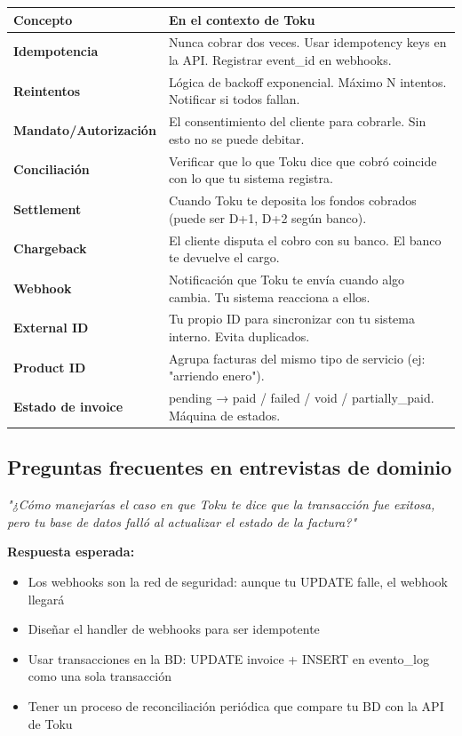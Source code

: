 \documentclass[11pt,a4paper]{article}
\begin{document}
\begin{center}
\begin{tabular}{p{3.5cm}p{10.5cm}}
\toprule
\textbf{Concepto} & \textbf{En el contexto de Toku} \\
\midrule
\textbf{Idempotencia} & Nunca cobrar dos veces. Usar idempotency keys en la API. Registrar event\_id en webhooks. \\
\textbf{Reintentos} & Lógica de backoff exponencial. Máximo N intentos. Notificar si todos fallan. \\
\textbf{Mandato/Autorización} & El consentimiento del cliente para cobrarle. Sin esto no se puede debitar. \\
\textbf{Conciliación} & Verificar que lo que Toku dice que cobró coincide con lo que tu sistema registra. \\
\textbf{Settlement} & Cuando Toku te deposita los fondos cobrados (puede ser D+1, D+2 según banco). \\
\textbf{Chargeback} & El cliente disputa el cobro con su banco. El banco te devuelve el cargo. \\
\textbf{Webhook} & Notificación que Toku te envía cuando algo cambia. Tu sistema reacciona a ellos. \\
\textbf{External ID} & Tu propio ID para sincronizar con tu sistema interno. Evita duplicados. \\
\textbf{Product ID} & Agrupa facturas del mismo tipo de servicio (ej: "arriendo enero"). \\
\textbf{Estado de invoice} & pending → paid / failed / void / partially\_paid. Máquina de estados. \\
\bottomrule
\end{tabular}
\end{center}

\subsection{Preguntas frecuentes en entrevistas de dominio}

\begin{tcolorbox}[colback=warnambel!5,colframe=warnambel,title=\textbf{Pregunta probable en entrevista}]
\textit{"¿Cómo manejarías el caso en que Toku te dice que la transacción fue exitosa,
pero tu base de datos falló al actualizar el estado de la factura?"}

\textbf{Respuesta esperada:}
\begin{itemize}
  \item Los webhooks son la red de seguridad: aunque tu UPDATE falle, el webhook llegará
  \item Diseñar el handler de webhooks para ser idempotente
  \item Usar transacciones en la BD: UPDATE invoice + INSERT en evento\_log como una sola transacción
  \item Tener un proceso de reconciliación periódica que compare tu BD con la API de Toku
\end{itemize}
\end{tcolorbox}
\end{document}
